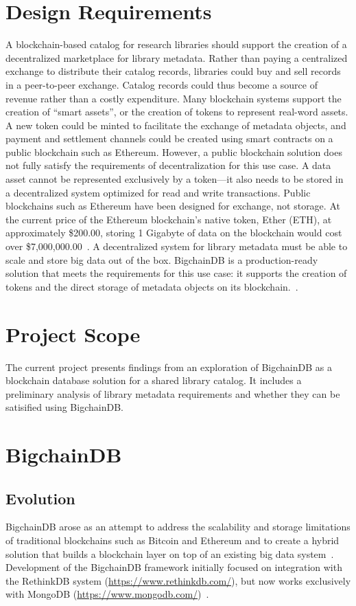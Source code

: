 \section{Design Requirements}
A blockchain-based catalog for research libraries should support the
creation of a decentralized marketplace for library metadata. Rather than
paying a centralized exchange to distribute their catalog records, libraries
could buy and sell records in a peer-to-peer exchange. Catalog records could
thus become a source of revenue rather than a costly expenditure. Many
blockchain systems support the creation of ``smart assets'', or the creation
of tokens to represent real-word assets. A new token could be minted to
facilitate the exchange of metadata objects, and payment and settlement
channels could be created using smart contracts on a public blockchain such
as Ethereum. However, a public blockchain solution does not fully satisfy
the requirements of decentralization for this use case. A data asset cannot
be represented exclusively by a token---it also needs to be stored in a
decentralized system optimized for read and write transactions. Public
blockchains such as Ethereum have been designed for exchange, not storage.
At the current price of the Ethereum blockchain's native token, Ether (ETH),
at approximately \$200.00, storing 1 Gigabyte of data on the blockchain
would cost over \$7,000,000.00~\cite{tHess16}. A decentralized system for
library metadata must be able to scale and store big data out of the box.
BigchainDB is a production-ready solution that meets the requirements for
this use case: it supports the creation of tokens and the direct storage of
metadata objects on its blockchain.~\cite{bdb18c}.

\section{Project Scope}
The current project presents findings from an exploration of BigchainDB as a 
blockchain database solution for a shared library catalog. It includes a 
preliminary analysis of library metadata requirements and whether they can be 
satisified using BigchainDB.

\section{BigchainDB}
\subsection{Evolution}
BigchainDB arose as an attempt to address the scalability and storage
limitations of traditional blockchains such as Bitcoin and Ethereum and to
create a hybrid solution that builds a blockchain layer on top of an
existing big data system~\cite{bigDB18}. Development of the BigchainDB
framework initially focused on integration with the RethinkDB system
(\url{https://www.rethinkdb.com/}), but now works exclusively with MongoDB
(\url{https://www.mongodb.com/})~\cite{ks16, bigDB18}.

